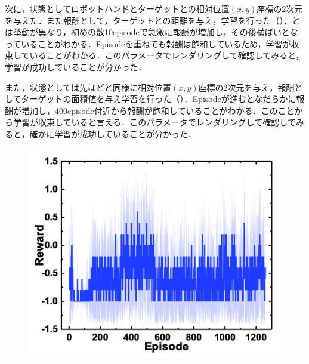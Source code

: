 次に，状態としてロボットハンドとターゲットとの相対位置$(x,y)$座標の2次元を与えた．また報酬として，ターゲットとの距離を与え，学習を行った（）．とは挙動が異なり，初めの数10episodeで急激に報酬が増加し，その後横ばいとなっていることがわかる．Episodeを重ねても報酬は飽和しているため，学習が収束していることがわかる．このパラメータでレンダリングして確認してみると，学習が成功していることが分かった．

また，状態としては先ほどと同様に相対位置$(x,y)$座標の2次元を与え，報酬としてターゲットの面積値を与え学習を行った（）．Episodeが進むとなだらかに報酬が増加し，400episode付近から報酬が飽和していることがわかる．このことから学習が収束していると言える．このパラメータでレンダリングして確認してみると，確かに学習が成功していることが分かった．

\begin{figure}
    \centering
    \begin{minipage}[t]{0.45\linewidth}
        \centering
        \includegraphics[width=\linewidth]{figure/chapter3/rew=01_obs=面積重心_origin}
        \label{fig:報酬離散}
    \end{minipage}
    \hspace*{\fill}
    \begin{minipage}[t]{0.45\linewidth}
        \centering

\end{minipage}
\end{figure}
